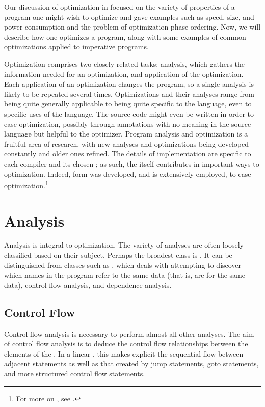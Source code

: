 \label{imperative:optimizing}
Our discussion of optimization in  focused on the variety of properties of a program one might wish to optimize and gave examples such as speed, size, and power consumption and the problem of optimization phase ordering. Now, we will describe how one optimizes a program, along with some examples of common optimizations applied to imperative programs.

Optimization comprises two closely-related tasks: analysis, which gathers the information needed for an optimization, and application of the optimization. Each application of an optimization changes the program, so a single analysis is likely to be repeated several times. Optimizations and their analyses range from being quite generally applicable to being quite specific to the language, even to specific uses of the language. The source code might even be written in order to ease optimization, possibly through annotations with no meaning in the source language but helpful to the optimizer. Program analysis and optimization is a fruitful area of research, with new analyses and optimizations being developed constantly and older ones refined. The details of implementation are specific to each compiler and its chosen \IRs{}; as such, the \IR itself contributes in important ways to optimization. Indeed, \SSA[long] form was developed, and is extensively employed, to ease optimization.\footnote{For more on \SSA{}, see .}

\section{Analysis}
Analysis is integral to optimization. The variety of analyses are often loosely classified based on their subject. Perhaps the broadest class is . It can be distinguished from classes such as , which deals with attempting to discover which names in the program refer to the same data (that is, are  for the same data), control flow analysis, and dependence analysis.

\subsection{Control Flow}
Control flow analysis is necessary to perform almost all other analyses. The aim of control flow analysis is to deduce the control flow relationships between the elements of the \IR{}. In a linear , this makes explicit the sequential flow between adjacent statements as well as that created by jump statements, goto statements, and more structured control flow statements.

